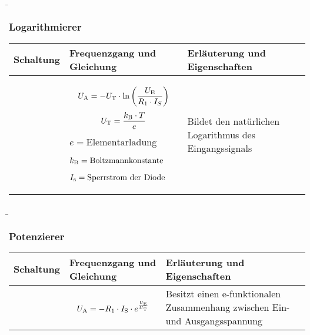 \begin{frame}
    \b{
    \frametitle{Logarithmierer}
    \centering
    \begin{table}[ht]
    \label{tab:Logarithmierer}
    \begin{tabular}{|m{}|m{}|m{}|}
    \hline
    Schaltung & Frequenzgang und Gleichung & Erläuterung und Eigenschaften\\ %
    \hline
    \vspace{0.5cm}
    \centering
    
    &
    \begin{center}
    \[
    U_{\textnormal{A}} =-U_{\textnormal{T}}\cdot \ln{\left(\frac{U_{\textnormal{E}}}{R_1\cdot I_S}\right)}
    \]
        \[
            U_{\textnormal{T}} = \frac{k_{\textnormal{B}} \cdot T}{e}
            \]
            
            \(e = \text{Elementarladung}\)
            
            \(k_{\textnormal{B}} = \text{Boltzmannkonstante}\)
            
            \(I_{\textnormal{s}} = \text{Sperrstrom der Diode}\)
    \end{center} 
    & 
    Bildet den natürlichen Logarithmus des Eingangssignals \\
    \hline
    \end{tabular}
    \end{table}
    }
\end{frame}


\begin{frame}
    \b{
        \frametitle{Potenzierer}
    \centering
    \begin{table}[ht]
    \label{tab:Potenzierer}
    \begin{tabular}{|m{}|m{}|m{}|}
    \hline
    Schaltung & Frequenzgang und Gleichung & Erläuterung und Eigenschaften\\ %
    \hline
    \vspace{0.5cm}
    \centering
    
    &
    \begin{center}
    \[
    U_{\textnormal{A}} =-R_1\cdot I_{\textnormal{S}} \cdot e^{\frac{U_{\textnormal{E}}}{U_{\textnormal{T}}}}
    \]
    \end{center} 
    & 
    Besitzt einen e-funktionalen Zusammenhang zwischen Ein- und Ausgangsspannung \\
    \hline
    \end{tabular}
    \end{table}
    }
\end{frame}


